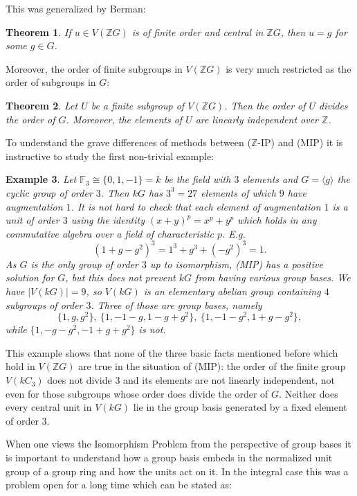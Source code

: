 \documentclass[11pt, a4paper]{amsart}
\newtheorem{theorem}{Theorem}[section]
\newtheorem{example}[theorem]{Example}
\theoremstyle{definition}
\begin{document}
This was generalized by Berman:

\begin{theorem}\cite{Berman55Torsion}
If $u \in V(\mathbb{Z}G)$ is of finite order and central in $\mathbb{Z}G$, then $u = g$ for some $g \in G$.
\end{theorem}

Moreover, the order of finite subgroups in $V(\mathbb{Z}G)$ is very much restricted as the order of subgroups in $G$:

\begin{theorem}\cite{ZK}
Let $U$ be a finite subgroup of $V(\mathbb{Z}G)$. Then the order of $U$ divides the order of $G$. Moreover, the elements of $U$ are linearly independent over $\mathbb{Z}$.
\end{theorem}

To understand the grave differences of methods between ($\mathbb{Z}$-IP) and (MIP) it is instructive to study the first non-trivial example:

\begin{example}\label{ex:kC3} 
Let $\mathbb{F}_3 \cong \{0,1,-1\} = k$ be the field with $3$ elements and $G = \langle g \rangle$ the cyclic group of order $3$. Then $kG$ has $3^3 = 27$ elements of which $9$ have augmentation $1$. It is not hard to check that each element of augmentation $1$ is a unit of order $3$ using the identity $(x+y)^p = x^p + y^p$ which holds in any commutative algebra over a field of characteristic $p$. E.g.\
\[ (1 + g - g^2)^3 = 1^3 + g^3 + (-g^2)^3 = 1.\]
As $G$ is the only group of order $3$ up to isomorphism, (MIP) has a positive solution for $G$, but this does not prevent $kG$ from having various group bases. We have $|V(kG)| = 9$, so $V(kG)$ is an elementary abelian group containing $4$ subgroups of order $3$. Three of those are group bases, namely
\[\{1, g, g^2 \},  \ \{1, -1-g, 1-g+g^2 \}, \  \{1, -1-g^2, 1+g -g^2 \}, \]
while $ \{1, -g-g^2, -1 + g + g^2 \}$ is not.
\end{example}

This example shows that none of the three basic facts mentioned before which hold in $V(\mathbb{Z}G)$ are true in the situation of (MIP): the order of the finite group $V(kC_3)$ does not divide $3$ and its elements are not linearly independent, not even for those subgroups whose order does divide the order of $G$. Neither does every central unit in $V(kG)$ lie in the group basis generated by a fixed element of order $3$. 


When one views the Isomorphism Problem from the perspective of group bases it is important to understand how a group basis embeds in the normalized unit group of a group ring and how the units act on it. In the integral case this was a problem open for a long time which can be stated as:
\end{document}
